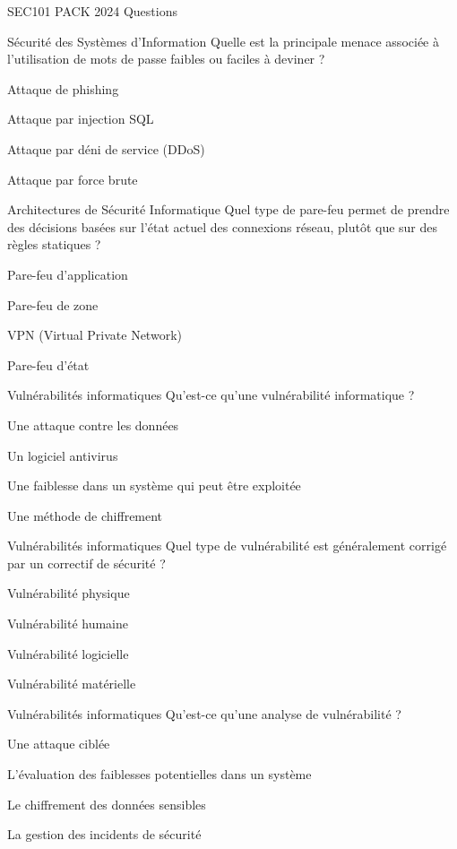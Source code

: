 \documentclass[12pt]{article}
\begin{document}
\begin{quiz}{SEC101 PACK 2024 Questions}
  \begin{multi}[points=1]{Sécurité des Systèmes d'Information}
    Quelle est la principale menace associée à l'utilisation de mots de passe faibles ou faciles à deviner ?
    \item Attaque de phishing
    \item Attaque par injection SQL
    \item Attaque par déni de service (DDoS)
    \item* Attaque par force brute
  \end{multi}

  \begin{multi}[points=1]{Architectures de Sécurité Informatique}
    Quel type de pare-feu permet de prendre des décisions basées sur l'état actuel des connexions réseau, plutôt que sur des règles statiques ?
    \item Pare-feu d'application
    \item Pare-feu de zone
    \item VPN (Virtual Private Network)
    \item* Pare-feu d'état
  \end{multi}



  \begin{multi}[points=1]{Vulnérabilités informatiques}
     Qu'est-ce qu'une vulnérabilité informatique  ?
        \item Une attaque contre les données
        \item Un logiciel antivirus
        \item *Une faiblesse dans un système qui peut être exploitée
        \item Une méthode de chiffrement
      \end{multi} 
    
     \begin{multi}[points=1]{Vulnérabilités informatiques}
     Quel type de vulnérabilité est généralement corrigé par un correctif de sécurité  ?
        \item Vulnérabilité physique
        \item Vulnérabilité humaine
        \item *Vulnérabilité logicielle
        \item Vulnérabilité matérielle
      \end{multi} 
    
    \begin{multi}[points=1]{Vulnérabilités informatiques}
     Qu'est-ce qu'une analyse de vulnérabilité  ?
        \item Une attaque ciblée
        \item *L'évaluation des faiblesses potentielles dans un système
        \item Le chiffrement des données sensibles
        \item La gestion des incidents de sécurité
      \end{multi} 
    

\end{quiz}
\end{document}
